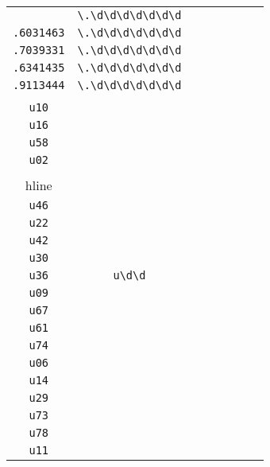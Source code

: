 \begin{longtable}{cccccccc}
\begin{tabular}{ll}
    \verb|.9110226| & \verb|\.\d\d\d\d\d\d\d|\\
\verb|.6031463| & \verb|\.\d\d\d\d\d\d\d|\\
\verb|.7039331| & \verb|\.\d\d\d\d\d\d\d|\\
\verb|.6341435| & \verb|\.\d\d\d\d\d\d\d|\\
\verb|.9113444| & \verb|\.\d\d\d\d\d\d\d|
\end{tabular}
\\\midrule 
\begin{tabular}{l}
    \verb|u43|\\
\verb|u10|\\
\verb|u16|\\
\verb|u58|\\
\verb|u02|\\
\\hline\\
\verb|u46|\\
\verb|u22|\\
\verb|u42|\\
\verb|u30|\\
\verb|u36|
\end{tabular}

&
\verb|u\d\d|
&

\begin{tabular}{l}
    \verb|u\d\d|\\
\verb|u09|\\
\verb|u67|\\
\verb|u61|\\
\verb|u74|\\
\verb|u06|
\end{tabular}

&

\begin{tabular}{l}
    \verb|u\d\d|\\
\verb|u14|\\
\verb|u29|\\
\verb|u73|\\
\verb|u78|\\
\verb|u11|
\end{tabular}

&


\end{longtable}
